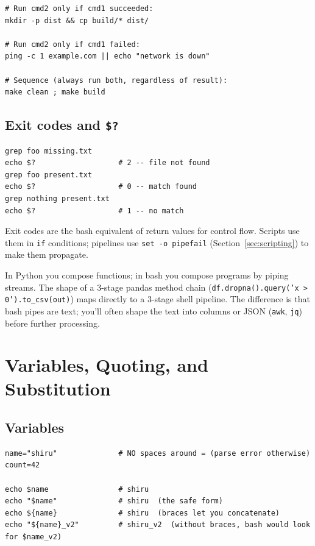 \documentclass[11pt,a4paper]{article}
\newcommand{\pcmd}[1]{\texttt{\textcolor{pyKw}{#1}}}
\begin{document}
\begin{lstlisting}[style=bashstyle]
# Run cmd2 only if cmd1 succeeded:
mkdir -p dist && cp build/* dist/

# Run cmd2 only if cmd1 failed:
ping -c 1 example.com || echo "network is down"

# Sequence (always run both, regardless of result):
make clean ; make build
\end{lstlisting}

\subsection*{Exit codes and \texttt{\$?}}

\begin{lstlisting}[style=bashstyle]
grep foo missing.txt
echo $?                   # 2 -- file not found
grep foo present.txt
echo $?                   # 0 -- match found
grep nothing present.txt
echo $?                   # 1 -- no match
\end{lstlisting}

Exit codes are the bash equivalent of return values for control
flow. Scripts use them in \texttt{if} conditions; pipelines use
\texttt{set -o pipefail} (Section~\ref{sec:scripting}) to make
them propagate.

\begin{comparepy}
In Python you compose functions; in bash you compose programs by
piping streams. The shape of a 3-stage pandas method chain
(\pcmd{df.dropna().query('x > 0').to\_csv(out)}) maps directly to
a 3-stage shell pipeline. The difference is that bash pipes are
text; you'll often shape the text into columns or JSON
(\texttt{awk}, \texttt{jq}) before further processing.
\end{comparepy}

\section{Variables, Quoting, and Substitution}

\subsection*{Variables}

\begin{lstlisting}[style=bashstyle]
name="shiru"              # NO spaces around = (parse error otherwise)
count=42

echo $name                # shiru
echo "$name"              # shiru  (the safe form)
echo ${name}              # shiru  (braces let you concatenate)
echo "${name}_v2"         # shiru_v2  (without braces, bash would look for $name_v2)
\end{lstlisting}
\end{document}
